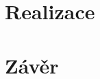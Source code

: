 \documentclass [a4paper,11pt,oneside,notitlepage,openright]{report} %
\begin{document}
	\part{Realizace}\label{part:realizace}
		
	\part{Závěr}\label{part:zaver}
		



\nocite{*} %

\cleardoublepage




\end{document}
